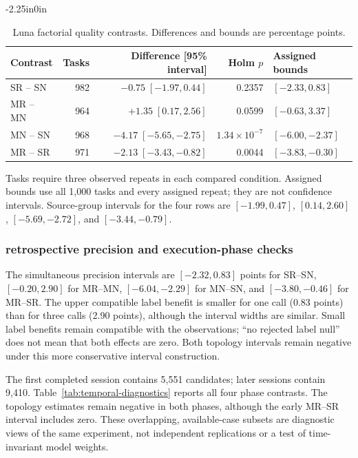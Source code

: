 \documentclass[10pt,letterpaper]{article}
\begin{document}
\FloatBarrier
\begin{table}[!ht]
\begin{adjustwidth}{-2.25in}{0in}\centering
\caption{Luna factorial quality contrasts. Differences and bounds are percentage points.}
\label{tab:scale-contrasts}
\small
\begin{tabular}{@{}lrrrl@{}}\toprule
Contrast & Tasks & Difference [95\% interval] & Holm $p$ & Assigned bounds\\\midrule
SR -- SN & 982 & $-0.75\;[-1.97, 0.44]$ & 0.2357 & $[-2.33, 0.83]$\\
MR -- MN & 964 & $+1.35\;[0.17, 2.56]$ & 0.0599 & $[-0.63, 3.37]$\\
MN -- SN & 968 & $-4.17\;[-5.65,-2.75]$ & $1.34\!\times\!10^{-7}$ & $[-6.00,-2.37]$\\
MR -- SR & 971 & $-2.13\;[-3.43,-0.82]$ & 0.0044 & $[-3.83,-0.30]$\\
\bottomrule\end{tabular}
\par\smallskip\noindent Tasks require three observed repeats in each compared condition. Assigned bounds use all 1,000 tasks and every assigned repeat; they are not confidence intervals. Source-group intervals for the four rows are $[-1.99,0.47]$, $[0.14,2.60]$, $[-5.69,-2.72]$, and $[-3.44,-0.79]$.
\end{adjustwidth}
\end{table}
\FloatBarrier


\subsubsection*{retrospective precision and execution-phase checks}
The simultaneous precision intervals are $[-2.32,0.83]$ points for SR--SN, $[-0.20,2.90]$ for MR--MN, $[-6.04,-2.29]$ for MN--SN, and $[-3.80,-0.46]$ for MR--SR. The upper compatible label benefit is smaller for one call (0.83 points) than for three calls (2.90 points), although the interval widths are similar. Small label benefits remain compatible with the observations; ``no rejected label null'' does not mean that both effects are zero. Both topology intervals remain negative under this more conservative interval construction.

The first completed session contains 5,551 candidates; later sessions contain 9,410. Table~\ref{tab:temporal-diagnostics} reports all four phase contrasts. The topology estimates remain negative in both phases, although the early MR--SR interval includes zero. These overlapping, available-case subsets are diagnostic views of the same experiment, not independent replications or a test of time-invariant model weights.
\end{document}
